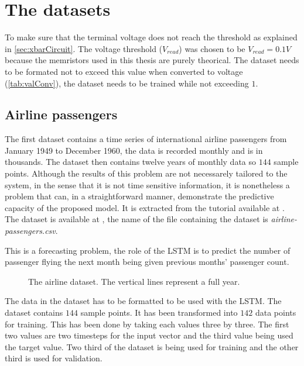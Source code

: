 \section{The datasets}\label{sec:dataset}

To make sure that the terminal voltage does not reach the threshold as explained in \cref{sec:xbarCircuit}. The voltage threshold ($V_{read}$) was chosen to be $V_{read}=0.1V$ because the memristors used in this thesis are purely theorical. The dataset needs to be formated not to exceed this value when converted to voltage (\cref{tab:valConv}), the dataset needs to be trained while not exceeding $1$.

\subsection{Airline passengers}

The first dataset contains a time series of international airline passengers from January 1949 to December 1960, the data is recorded monthly and is in thousands. The dataset then contains twelve years of monthly data so $144$ sample points. Although the results of this problem are not necessarely tailored to the system, in the sense that it is not time sensitive information, it is nonetheless a problem that can, in a straightforward manner, demonstrate the predictive capacity of the proposed model. It is extracted from the tutorial available at \cite{airline}. The dataset is available at \cite{datasets}, the name of the file containing the dataset is \textit{airline-passengers.csv}.

This is a forecasting problem, the role of the \ac{LSTM} is to predict the number of passenger flying the next month being given previous months' passenger count.

\begin{figure}[H]
  \centering
  
  \caption{The airline dataset. The vertical lines represent a full year.}
  \label{graph:airline}
\end{figure}

The data in the dataset has to be formatted to be used with the \ac{LSTM}. The dataset contains $144$ sample points. It has been transformed into $142$ data points for training. This has been done by taking each values three by three. The first two values are two timesteps for the input vector and the third value being used the target value. Two third of the dataset is being used for training and the other third is used for validation.

